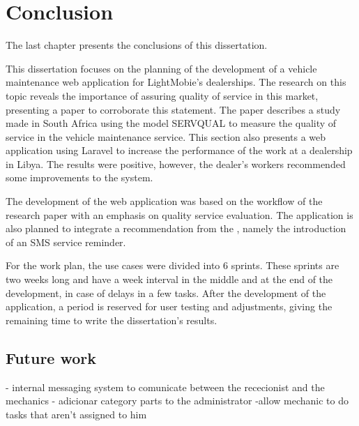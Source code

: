 \chapter{Conclusion}%
\label{chapter:conclusion}

\begin{introduction}
The last chapter presents the conclusions of this dissertation.
\end{introduction} 


This dissertation focuses on the planning of the development of a vehicle maintenance web application for LightMobie's dealerships. 
The research on this topic reveals the importance of assuring quality of service in this market, presenting a paper to corroborate this statement.
The paper describes a study made in South Africa using the model SERVQUAL to measure the quality of service in the vehicle maintenance service.
This section also presents a web application using Laravel to increase the performance of the work at a dealership in Libya. 
The results were positive, however, the dealer's workers recommended some improvements to the system.

The development of the web application was based on the workflow of the research paper with an emphasis on quality service evaluation.
The application is also planned to integrate a recommendation from the \citet{MAS_MOTORS}, namely the introduction of an SMS service reminder. 

For the work plan, the use cases were divided into 6 sprints. 
These sprints are two weeks long and have a week interval in the middle and at the end of the development, in case of delays in a few tasks.
After the development of the application, a period is reserved for user testing and adjustments, giving the remaining time to write the dissertation's results.


\section{Future work}

- internal messaging system to comunicate between the rececionist and the mechanics
- adicionar category parts to the administrator
-allow mechanic to do tasks that aren't assigned to him

